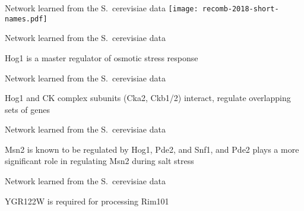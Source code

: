 \documentclass[aspectratio=169]{beamer}
\begin{document}

\begin{frame}{}\small  
\end{frame}


\begin{frame}{Network learned from the S.\ cerevisiae data}
\texttt{[image: recomb-2018-short-names.pdf]}
\end{frame}


\begin{frame}{Network learned from the S.\ cerevisiae data}

\vfill

Hog1 is a master regulator of osmotic stress response
\end{frame}


\begin{frame}{Network learned from the S.\ cerevisiae data}

\vfill

Hog1 and CK complex subunits (Cka2, Ckb1/2) interact, regulate overlapping sets of genes
\end{frame}


\begin{frame}{Network learned from the S.\ cerevisiae data}

\vfill

Msn2 is known to be regulated by Hog1, Pde2, and Snf1, and Pde2 plays a more significant role in regulating Msn2 during salt stress
\end{frame}


\begin{frame}{Network learned from the S.\ cerevisiae data}

\vfill

YGR122W is required for processing Rim101
\end{frame}
\end{document}
